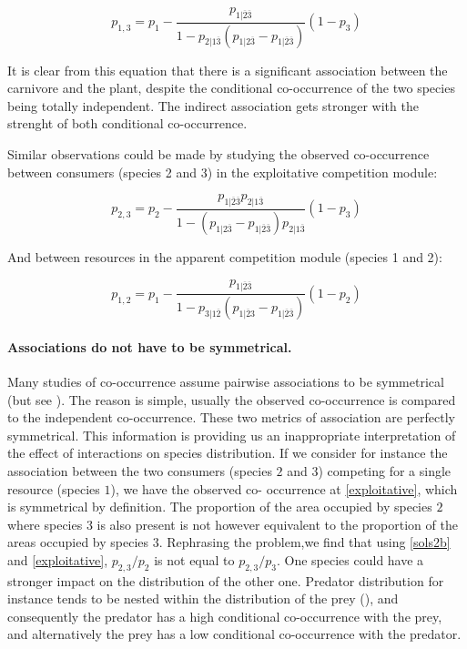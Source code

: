 \begin{equation} \label{linear}
  p_{1,3} = p_1-\frac{p_{1|\overline{2}\overline{3}}}{1-p_{2|1\overline{3}}( p_{1|2\overline{3}} - p_{1|\overline{2}\overline{3}})}(1-p_3)
\end{equation}

It is clear from this equation that there is a significant association between
the carnivore and the plant, despite the conditional co-occurrence of the two
species being totally independent. The indirect association gets stronger with
the strenght of both conditional co-occurrence.

Similar observations could be made by studying the observed co-occurrence between
consumers (species 2 and 3) in the exploitative competition module:

\begin{equation} \label{exploitative}
  p_{2,3} = p_2-\frac{p_{1|\overline{2}\overline{3}}p_{2|1\overline{3}}}{1- (p_{1|2\overline{3}}-p_{1|\overline{2}\overline{3}})p_{2|1\overline{3}}}(1-p_3)
\end{equation}

And between resources in the apparent competition module (species 1 and 2):

\begin{equation} \label{apparent}
  p_{1,2} = p_1-\frac{p_{1|\overline{2}\overline{3}}}{1- p_{3|1\overline{2}}( p_{1|\overline{2}3} - p_{1|\overline{2}\overline{3}})}(1-p_2)
\end{equation}

\paragraph{Associations do not have to be symmetrical.} Many studies of co-occurrence assume pairwise associations to be symmetrical (but see
\citealt{Araujo2011Using, Boulangeat2012Accounting}). The reason is simple, usually the observed
co-occurrence is compared to the independent co-occurrence. These two metrics
of association are perfectly symmetrical. This information is providing us an
inappropriate interpretation of the effect of interactions on species
distribution. If we consider for instance the association between the two
consumers (species $2$ and $3$) competing for a single resource (species $1$),
we have the observed co- occurrence at \eqref{exploitative}, which is
symmetrical by definition. The proportion of the area occupied by species $2$
where species $3$ is also present is not however equivalent to the proportion
of the areas occupied by species $3$. Rephrasing the problem,we find that
using \eqref{sols2b} and \eqref{exploitative}, $p_{2,3}/p_{2}$ is not equal to
$p_{2,3}/p_{3}$. One species could have a stronger impact on the distribution
of the other one. Predator distribution for instance tends to be
nested within the distribution of the prey (\citealt{Gravel2011Trophic}), and
consequently the predator has a high conditional co-occurrence with the prey,
and alternatively the prey has a low conditional co-occurrence with the
predator.

